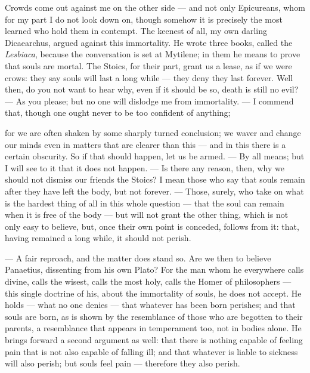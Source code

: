  Crowds come out against me on the other side — and not only Epicureans, whom for my part I do not look down on, though somehow it is precisely the most learned who hold them in contempt. The keenest of all, my own darling Dicaearchus, argued against this immortality. He wrote three books, called the \textit{Lesbiaca}, because the conversation is set at Mytilene; in them he means to prove that souls are mortal. The Stoics, for their part, grant us a lease, as if we were crows: they say souls will last a long while — they deny they last forever. Well then, do you not want to hear why, even if it should be so, death is still no evil? — As you please; but no one will dislodge me from immortality. — I commend that, though one ought never to be too confident of anything;

 for we are often shaken by some sharply turned conclusion; we waver and change our minds even in matters that are clearer than this — and in this there is a certain obscurity. So if that should happen, let us be armed. — By all means; but I will see to it that it does not happen. — Is there any reason, then, why we should not dismiss our friends the Stoics? I mean those who say that souls remain after they have left the body, but not forever. — Those, surely, who take on what is the hardest thing of all in this whole question — that the soul can remain when it is free of the body — but will not grant the other thing, which is not only easy to believe, but, once their own point is conceded, follows from it: that, having remained a long while, it should not perish.

 — A fair reproach, and the matter does stand so. Are we then to believe Panaetius, dissenting from his own Plato? For the man whom he everywhere calls divine, calls the wisest, calls the most holy, calls the Homer of philosophers — this single doctrine of his, about the immortality of souls, he does not accept. He holds — what no one denies — that whatever has been born perishes; and that souls are born, as is shown by the resemblance of those who are begotten to their parents, a resemblance that appears in temperament too, not in bodies alone. He brings forward a second argument as well: that there is nothing capable of feeling pain that is not also capable of falling ill; and that whatever is liable to sickness will also perish; but souls feel pain — therefore they also perish.

